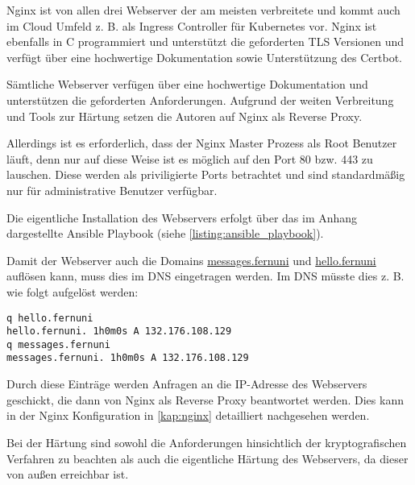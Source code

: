 Nginx ist von allen drei Webserver der am meisten verbreitete und kommt auch im Cloud Umfeld z. B. als Ingress Controller für Kubernetes vor. Nginx ist ebenfalls in C programmiert und unterstützt die geforderten \ac{TLS} Versionen und verfügt über eine hochwertige Dokumentation sowie Unterstützung des Certbot.

Sämtliche Webserver verfügen über eine hochwertige Dokumentation und unterstützen die geforderten Anforderungen. Aufgrund der weiten Verbreitung und Tools zur Härtung setzen die Autoren auf Nginx als Reverse Proxy.

Allerdings ist es erforderlich, dass der Nginx Master Prozess als Root Benutzer läuft, denn nur auf diese Weise ist es möglich auf den Port 80 bzw. 443 zu lauschen. Diese werden als priviligierte Ports betrachtet und sind standardmäßig nur für administrative Benutzer verfügbar.

Die eigentliche Installation des Webservers erfolgt über das im Anhang dargestellte Ansible Playbook (siehe \autoref{listing:ansible_playbook}).

Damit der Webserver auch die Domains \url{messages.fernuni} und \url{hello.fernuni} auflösen kann, muss dies im \ac*{DNS} eingetragen werden. Im \ac{DNS} müsste dies z. B. wie folgt aufgelöst werden:

\begin{verbatim}
q hello.fernuni
hello.fernuni. 1h0m0s A 132.176.108.129
q messages.fernuni
messages.fernuni. 1h0m0s A 132.176.108.129
\end{verbatim}

Durch diese Einträge werden Anfragen an die IP-Adresse des Webservers geschickt, die dann von Nginx als Reverse Proxy beantwortet werden. Dies kann in der Nginx Konfiguration in \autoref{kap:nginx} detailliert nachgesehen werden.

Bei der Härtung sind sowohl die Anforderungen hinsichtlich der kryptografischen Verfahren zu beachten als auch die eigentliche Härtung des Webservers, da dieser von außen erreichbar ist.




